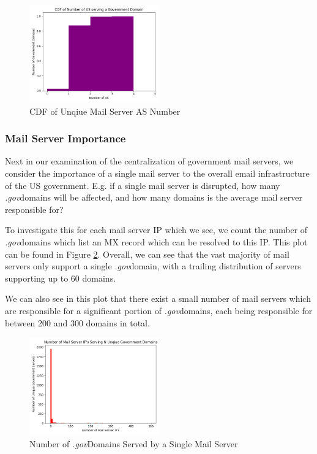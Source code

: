 \documentclass{hotnets21}
\newcommand{\dotgov}{\textit{.gov}\space}
\begin{document}
\begin{figure}
\label{fig:asncdf}
\noindent\includegraphics[width=0.5\textwidth]{Summary/ASN Count CDF.png}
\caption{CDF of Unqiue Mail Server AS Number}
\end{figure}

\subsubsection{Mail Server Importance}

Next in our examination of the centralization of government mail servers, we consider the importance of a single mail server to the overall email infrastructure of the US government.
E.g. if a single mail server is disrupted, how many \dotgov domains will be affected, and how many domains is the average mail server responsible for?

To investigate this for each mail server IP which we see, we count the number of \dotgov domains which list an MX record which can be resolved to this IP.
This plot can be found in Figure \ref{fig:domainsperms}.
Overall, we can see that the vast majority of mail servers only support a single \dotgov domain, with a trailing distribution of servers supporting up to 60 domains. 

We can also see in this plot that there exist a small number of mail servers which are responsible for a significant portion of \dotgov domains, each being responsible for between 200 and 300 domains in total.

\begin{figure}
\label{fig:domainsperms}
\noindent\includegraphics[width=0.5\textwidth]{Summary/Domains Per Exchange IP.png}
\caption{Number of \dotgov Domains Served by a Single Mail Server}
\end{figure}
\end{document}
